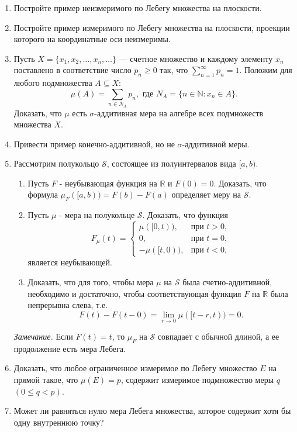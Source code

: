 \documentclass[12pt,a4paper]{article}
\begin{document}
\begin{enumerate}
\item Постройте пример неизмеримого по Лебегу множества на плоскости.
\item Постройте пример измеримого по Лебегу множества на плоскости, проекции которого на координатные оси неизмеримы.

\item Пусть $X = \{x_{1}, x_{2}, \dots, x_{n}, \dots\}$ — счетное множество и каждому элементу $x_{n}$ поставлено в соответствие число $p_{n} \ge 0$ так, что $\sum_{n=1}^{\infty} p_{n} = 1$. Положим для любого подмножества $A \subseteq X$:
$$\mu(A) = \sum_{n \in N_{A}} p_{n}, \text{ где } N_{A} = \{n \in \mathbb{N} : x_{n} \in A\}.$$
Доказать, что $\mu$ есть $\sigma$-аддитивная мера на алгебре всех подмножеств множества $X$.

\item Привести пример конечно-аддитивной, но не $\sigma$-аддитивной меры.

\item Рассмотрим полукольцо $\mathcal{S}$, состоящее из полуинтервалов вида $[a, b)$.
\begin{enumerate}[label=\alph*)]
\item Пусть $F$ - неубывающая функция на $\mathbb{R}$ и $F(0)=0$. Доказать, что формула $\mu_{F}([a,b)) = F(b) - F(a)$ определяет меру на $\mathcal{S}$.
\item Пусть $\mu$ - мера на полукольце $\mathcal{S}$. Доказать, что функция
$$F_{\mu}(t) =
\begin{cases} \mu([0,t)), & \text{при } t > 0, \\ 0, & \text{при } t = 0, \\ -\mu([t,0)), & \text{при } t < 0,
\end{cases}$$
является неубывающей.
\item Доказать, что для того, чтобы мера $\mu$ на $\mathcal{S}$ была счетно-аддитивной, необходимо и достаточно, чтобы соответствующая функция $F$ на $\mathbb{R}$ была непрерывна слева, т.е.
$$F(t) - F(t-0) = \lim_{r \rightarrow 0} \mu([t-r, t)) = 0.$$
\end{enumerate}
\textit{Замечание.} Если $F(t) = t$, то $\mu_{F}$ на $\mathcal{S}$ совпадает с обычной длиной, а ее продолжение есть мера Лебега.

\item Доказать, что любое ограниченное измеримое по Лебегу множество $E$ на прямой такое, что $\mu(E) = p$, содержит измеримое подмножество меры $q$ $(0 \le q < p)$.

\item Может ли равняться нулю мера Лебега множества, которое содержит хотя бы одну внутреннюю точку?


\end{enumerate}
\end{document}
